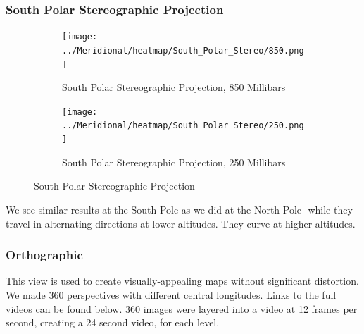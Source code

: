 \documentclass[hidelinks]{article}
\begin{document}
\subsubsection{South Polar Stereographic Projection}
\begin{figure}[h!]
	\begin{subfigure}[b]{\linewidth}
		\centering
		\texttt{[image: ../Meridional/heatmap/South\_Polar\_Stereo/850.png]}
		\caption{South Polar Stereographic Projection, 850 Millibars}
	\end{subfigure}
	\begin{subfigure}[b]{\linewidth}
		\centering
		\texttt{[image: ../Meridional/heatmap/South\_Polar\_Stereo/250.png]}
		\caption{South Polar Stereographic Projection, 250 Millibars}
	\end{subfigure}
	\caption{South Polar Stereographic Projection}
\end{figure}
\noindent We see similar results at the South Pole as we did at the North Pole- while they travel in alternating directions at lower altitudes. They curve at higher altitudes.
\newpage
\subsubsection{Orthographic}
This view is used to create visually-appealing maps without significant distortion. We made 360 perspectives with different central longitudes. Links to the full videos can be found below. 360 images were layered into a video at 12 frames per second, creating a 24 second video, for each level.
\end{document}
